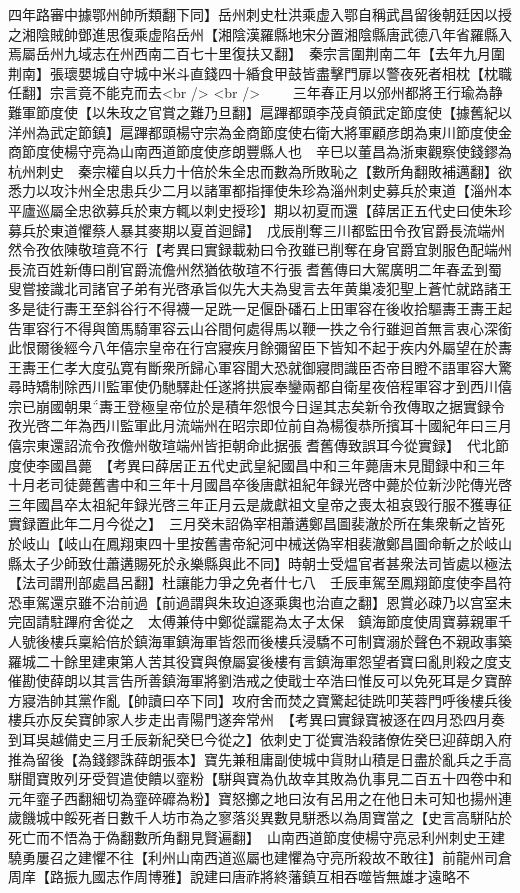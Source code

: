 四年路審中據鄂州帥所類翻下同】岳州刺史杜洪乘虚入鄂自稱武昌留後朝廷因以授之湘陰賊帥鄧進思復乘虚陷岳州【湘陰漢羅縣地宋分置湘陰縣唐武德八年省羅縣入焉屬岳州九域志在州西南二百七十里復扶又翻】　秦宗言圍荆南二年【去年九月圍荆南】張瓌嬰城自守城中米斗直錢四十緍食甲鼓皆盡擊門扉以警夜死者相枕【枕職任翻】宗言竟不能克而去<br />
<br />
　　三年春正月以邠州都將王行瑜為静難軍節度使【以朱玫之官賞之難乃旦翻】扈蹕都頭李茂貞領武定節度使【據舊紀以洋州為武定節鎮】扈蹕都頭楊守宗為金商節度使右衛大將軍顧彦朗為東川節度使金商節度使楊守亮為山南西道節度使彦朗豐縣人也　辛巳以董昌為浙東觀察使錢鏐為杭州刺史　秦宗權自以兵力十倍於朱全忠而數為所敗恥之【數所角翻敗補邁翻】欲悉力以攻汴州全忠患兵少二月以諸軍都指揮使朱珍為淄州刺史募兵於東道【淄州本平廬巡屬全忠欲募兵於東方輒以刺史授珍】期以初夏而還【薛居正五代史曰使朱珍募兵於東道懼蔡人暴其麥期以夏首迴歸】　戊辰削奪三川都監田令孜官爵長流端州然令孜依陳敬瑄竟不行【考異曰實録載勑曰令孜雖已削奪在身官爵宜剝服色配端州長流百姓新傳曰削官爵流儋州然猶依敬瑄不行張耆舊傳曰大駕廣明二年春孟到蜀叟嘗接識北司諸官子弟有光啓承旨似先大夫為叟言去年黄巢凌犯聖上蒼忙就路諸王多是徒行夀王至斜谷行不得襪一足跣一足偃卧磻石上田軍容在後收拾驅夀王夀王起告軍容行不得與箇馬騎軍容云山谷間何處得馬以鞭一抶之令行雖迴首無言衷心深銜此恨爾後經今八年僖宗皇帝在行宫寢疾月餘彌留臣下皆知不起于疾内外屬望在於夀王夀王仁孝大度弘寛有斷衆所歸心軍容聞大恐就御寢問識臣否帝目瞪不語軍容大驚尋時矯制除西川監軍使仍馳驛赴任遂將拱宸奉鑾兩都自衛星夜倍程軍容才到西川僖宗已崩國朝果夀王登極皇帝位於是積年怨恨今日逞其志矣新令孜傳取之据實録令孜光啓二年為西川監軍此月流端州在昭宗即位前自為楊復恭所擯耳十國紀年曰三月僖宗東還詔流令孜儋州敬瑄端州皆拒朝命此据張耆舊傳致誤耳今從實録】　代北節度使李國昌薨　【考異曰薛居正五代史武皇紀國昌中和三年薨唐末見聞録中和三年十月老司徒薨舊書中和三年十月國昌卒後唐獻祖紀年録光啓中薨於位新沙陀傳光啓三年國昌卒太祖紀年録光啓三年正月云是歲獻祖文皇帝之喪太祖哀毁行服不獲專征實録置此年二月今從之】　三月癸未詔偽宰相蕭遘鄭昌圖裴澈於所在集衆斬之皆死於岐山【岐山在鳳翔東四十里按舊書帝紀河中械送偽宰相裴澈鄭昌圖命斬之於岐山縣太子少師致仕蕭遘賜死於永樂縣與此不同】時朝士受煴官者甚衆法司皆處以極法【法司謂刑部處昌呂翻】杜讓能力爭之免者什七八　壬辰車駕至鳳翔節度使李昌符恐車駕還京雖不治前過【前過謂與朱玫迫逐乘輿也治直之翻】恩賞必疎乃以宫室未完固請駐蹕府舍從之　太傅兼侍中鄭從讜罷為太子太保　鎮海節度使周寶募親軍千人號後樓兵稟給倍於鎮海軍鎮海軍皆怨而後樓兵浸驕不可制寶溺於聲色不親政事築羅城二十餘里建東第人苦其役寶與僚屬宴後樓有言鎮海軍怨望者寶曰亂則殺之度支催勘使薛朗以其言告所善鎮海軍將劉浩戒之使戢士卒浩曰惟反可以免死耳是夕寶醉方寢浩帥其黨作亂【帥讀曰卒下同】攻府舍而焚之寶驚起徒跣叩芙蓉門呼後樓兵後樓兵亦反矣寶帥家人步走出青陽門遂奔常州　【考異曰實録寶被逐在四月恐四月奏到耳吳越備史三月壬辰新紀癸巳今從之】依刺史丁從實浩殺諸僚佐癸巳迎薛朗入府推為留後【為錢鏐誅薛朗張本】寶先兼租庸副使城中貨財山積是日盡於亂兵之手高駢聞寶敗列牙受賀遣使饋以韲粉【駢與寶為仇故幸其敗為仇事見二百五十四卷中和元年韲子西翻細切為韲碎䃺為粉】寶怒擲之地曰汝有呂用之在他日未可知也揚州連歲饑城中餒死者日數千人坊市為之寥落災異數見駢悉以為周寶當之【史言高駢阽於死亡而不悟為于偽翻數所角翻見賢遍翻】　山南西道節度使楊守亮忌利州刺史王建驍勇屢召之建懼不往【利州山南西道巡屬也建懼為守亮所殺故不敢往】前龍州司倉周庠【路振九國志作周博雅】說建曰唐祚將終藩鎮互相吞噬皆無雄才遠略不